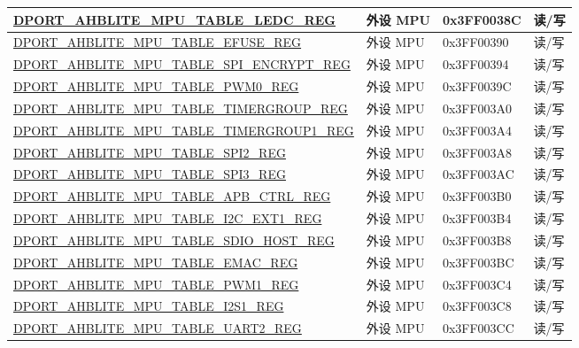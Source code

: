 \begin{longtable}{|L{8.2cm}|L{4.5cm}| l | l | }
\hyperref[regdesc:AHBLITEMPUTABLELEDCREG]{DPORT\_AHBLITE\_MPU\_TABLE\_LEDC\_REG} & 外设 MPU& 0x3FF0038C & 读/写 \\ \hline
\hyperref[regdesc:AHBLITEMPUTABLEEFUSEREG]{DPORT\_AHBLITE\_MPU\_TABLE\_EFUSE\_REG} & 外设 MPU& 0x3FF00390 & 读/写 \\ \hline
\hyperref[regdesc:AHBLITEMPUTABLESPIENCRYPTREG]{DPORT\_AHBLITE\_MPU\_TABLE\_SPI\_ENCRYPT\_REG} & 外设 MPU& 0x3FF00394 & 读/写 \\ \hline
\hyperref[regdesc:AHBLITEMPUTABLEPWM0REG]{DPORT\_AHBLITE\_MPU\_TABLE\_PWM0\_REG} & 外设 MPU& 0x3FF0039C & 读/写 \\ \hline
\hyperref[regdesc:AHBLITEMPUTABLETIMERGROUPREG]{DPORT\_AHBLITE\_MPU\_TABLE\_TIMERGROUP\_REG} & 外设 MPU& 0x3FF003A0 & 读/写 \\ \hline
\hyperref[regdesc:AHBLITEMPUTABLETIMERGROUP1REG]{DPORT\_AHBLITE\_MPU\_TABLE\_TIMERGROUP1\_REG} & 外设 MPU& 0x3FF003A4 & 读/写 \\ \hline
\hyperref[regdesc:AHBLITEMPUTABLESPI2REG]{DPORT\_AHBLITE\_MPU\_TABLE\_SPI2\_REG} & 外设 MPU& 0x3FF003A8 & 读/写 \\ \hline
\hyperref[regdesc:AHBLITEMPUTABLESPI3REG]{DPORT\_AHBLITE\_MPU\_TABLE\_SPI3\_REG} & 外设 MPU& 0x3FF003AC & 读/写 \\ \hline
\hyperref[regdesc:AHBLITEMPUTABLEAPBCTRLREG]{DPORT\_AHBLITE\_MPU\_TABLE\_APB\_CTRL\_REG} & 外设 MPU& 0x3FF003B0 & 读/写 \\ \hline
\hyperref[regdesc:AHBLITEMPUTABLEI2CEXT1REG]{DPORT\_AHBLITE\_MPU\_TABLE\_I2C\_EXT1\_REG} & 外设 MPU& 0x3FF003B4 & 读/写 \\ \hline
\hyperref[regdesc:AHBLITEMPUTABLESDIOHOSTREG]{DPORT\_AHBLITE\_MPU\_TABLE\_SDIO\_HOST\_REG} & 外设 MPU& 0x3FF003B8 & 读/写 \\ \hline
\hyperref[regdesc:AHBLITEMPUTABLEEMACREG]{DPORT\_AHBLITE\_MPU\_TABLE\_EMAC\_REG} & 外设 MPU& 0x3FF003BC & 读/写 \\ \hline
\hyperref[regdesc:AHBLITEMPUTABLEPWM1REG]{DPORT\_AHBLITE\_MPU\_TABLE\_PWM1\_REG} & 外设 MPU& 0x3FF003C4 & 读/写 \\ \hline
\hyperref[regdesc:AHBLITEMPUTABLEI2S1REG]{DPORT\_AHBLITE\_MPU\_TABLE\_I2S1\_REG} & 外设 MPU& 0x3FF003C8 & 读/写 \\ \hline
\hyperref[regdesc:AHBLITEMPUTABLEUART2REG]{DPORT\_AHBLITE\_MPU\_TABLE\_UART2\_REG} & 外设 MPU& 0x3FF003CC & 读/写 \\ \hline


\end{longtable}
